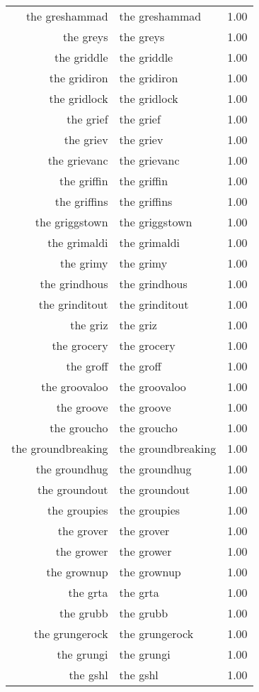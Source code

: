 \begin{table}[ht]
\begin{tabular}{rlr}
  the greshammad & the greshammad & 1.00 \\ 
  the greys & the greys & 1.00 \\ 
  the griddle & the griddle & 1.00 \\ 
  the gridiron & the gridiron & 1.00 \\ 
  the gridlock & the gridlock & 1.00 \\ 
  the grief & the grief & 1.00 \\ 
  the griev & the griev & 1.00 \\ 
  the grievanc & the grievanc & 1.00 \\ 
  the griffin & the griffin & 1.00 \\ 
  the griffins & the griffins & 1.00 \\ 
  the griggstown & the griggstown & 1.00 \\ 
  the grimaldi & the grimaldi & 1.00 \\ 
  the grimy & the grimy & 1.00 \\ 
  the grindhous & the grindhous & 1.00 \\ 
  the grinditout & the grinditout & 1.00 \\ 
  the griz & the griz & 1.00 \\ 
  the grocery & the grocery & 1.00 \\ 
  the groff & the groff & 1.00 \\ 
  the groovaloo & the groovaloo & 1.00 \\ 
  the groove & the groove & 1.00 \\ 
  the groucho & the groucho & 1.00 \\ 
  the groundbreaking & the groundbreaking & 1.00 \\ 
  the groundhug & the groundhug & 1.00 \\ 
  the groundout & the groundout & 1.00 \\ 
  the groupies & the groupies & 1.00 \\ 
  the grover & the grover & 1.00 \\ 
  the grower & the grower & 1.00 \\ 
  the grownup & the grownup & 1.00 \\ 
  the grta & the grta & 1.00 \\ 
  the grubb & the grubb & 1.00 \\ 
  the grungerock & the grungerock & 1.00 \\ 
  the grungi & the grungi & 1.00 \\ 
  the gshl & the gshl & 1.00 \\ 

\end{tabular}
\end{table}
